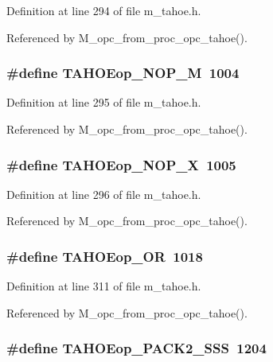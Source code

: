 Definition at line 294 of file m\_\-tahoe.h.

Referenced by M\_\-opc\_\-from\_\-proc\_\-opc\_\-tahoe().
\subsubsection{\setlength{\rightskip}{0pt plus 5cm}\#define TAHOEop\_\-NOP\_\-M~1004}\label{m__tahoe_8h_6db786fd195c0e4cfd0fef13a9660cbf}




Definition at line 295 of file m\_\-tahoe.h.

Referenced by M\_\-opc\_\-from\_\-proc\_\-opc\_\-tahoe().
\subsubsection{\setlength{\rightskip}{0pt plus 5cm}\#define TAHOEop\_\-NOP\_\-X~1005}\label{m__tahoe_8h_113580aca6d714b8c4964c359b2f0572}




Definition at line 296 of file m\_\-tahoe.h.

Referenced by M\_\-opc\_\-from\_\-proc\_\-opc\_\-tahoe().
\subsubsection{\setlength{\rightskip}{0pt plus 5cm}\#define TAHOEop\_\-OR~1018}\label{m__tahoe_8h_7fb03e1a0d38e465768cae1fe07fdabb}




Definition at line 311 of file m\_\-tahoe.h.

Referenced by M\_\-opc\_\-from\_\-proc\_\-opc\_\-tahoe().
\subsubsection{\setlength{\rightskip}{0pt plus 5cm}\#define TAHOEop\_\-PACK2\_\-SSS~1204}\label{m__tahoe_8h_8c4775fb48720f8d3c78a90e81364362}




